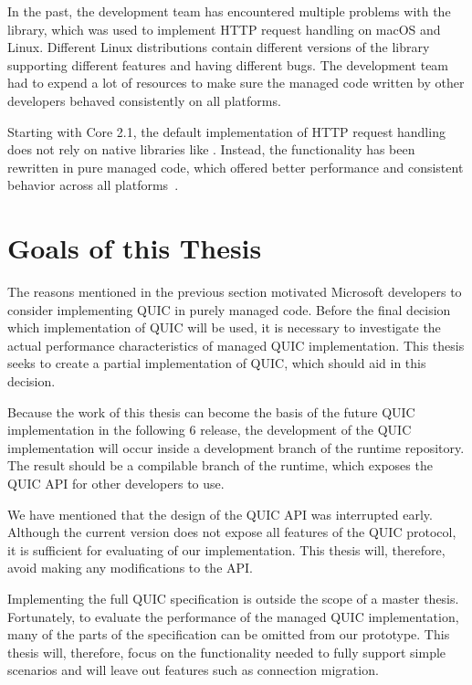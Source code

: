 In the past, the \dotnet{} development team has encountered multiple problems with the
\libcurl~\cite{curlGithub} library, which was used to implement HTTP request handling on macOS and
Linux. Different Linux distributions contain different versions of the \libcurl{} library supporting
different features and having different bugs. The \dotnet{} development team had to expend a lot of
resources to make sure the managed code written by other \dotnet{} developers behaved consistently
on all platforms.

Starting with \dotnet{} Core 2.1, the default implementation of HTTP request handling does not rely
on native libraries like \libcurl{}. Instead, the functionality has been rewritten in pure managed
code, which offered better performance and consistent behavior across all \dotnet{}
platforms~\cite{SocketsHttpHandlerDocs}.

\section{Goals of this Thesis}

The reasons mentioned in the previous section motivated Microsoft developers to consider
implementing QUIC in purely managed \csharp{} code. Before the final decision which implementation
of QUIC will be used, it is necessary to investigate the actual performance characteristics of
managed QUIC implementation. This thesis seeks to create a partial implementation of QUIC, which
should aid in this decision.

Because the work of this thesis can become the basis of the future QUIC implementation in the
following \dotnet{} 6 release, the development of the QUIC implementation will occur inside a
development branch of the \dotnet{} runtime repository. The result should be a compilable branch of
the runtime, which exposes the QUIC API for other \dotnet{} developers to use.

We have mentioned that the design of the QUIC API was interrupted early. Although the current
version does not expose all features of the QUIC protocol, it is sufficient for evaluating of our
implementation. This thesis will, therefore, avoid making any modifications to the API\@.

Implementing the full QUIC specification is outside the scope of a master thesis. Fortunately, to
evaluate the performance of the managed QUIC implementation, many of the parts of the specification
can be omitted from our prototype. This thesis will, therefore, focus on the functionality needed to
fully support simple scenarios and will leave out features such as connection migration.

